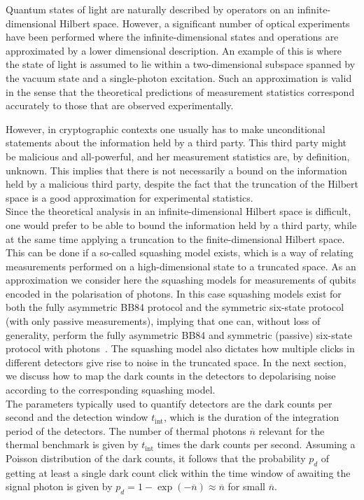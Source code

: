 \documentclass[aps,pra,reprint,superscriptaddress]{revtex4-1}
\begin{document}
Quantum states of light are naturally described by operators on an infinite-dimensional Hilbert space. However, a significant number of optical experiments have been performed where the infinite-dimensional states and operations are approximated by a lower dimensional description. An example of this is where the state of light is assumed to lie within a two-dimensional subspace spanned by the vacuum state and a single-photon excitation. Such an approximation is valid in the sense that the theoretical predictions of measurement statistics correspond accurately to those that are observed experimentally.

However, in cryptographic contexts one usually has to make unconditional statements about the information held by a third party. This third party might be malicious and all-powerful, and her measurement statistics are, by definition, unknown. This implies that there is not necessarily a bound on the information held by a malicious third party, despite the fact that the truncation of the Hilbert space is a good approximation for experimental statistics.\\

Since the theoretical analysis in an infinite-dimensional Hilbert space is difficult, one would prefer to be able to bound the information held by a third party, while at the same time applying a truncation to the finite-dimensional Hilbert space. This can be done if a so-called squashing model exists, which is a way of relating measurements performed on a high-dimensional state to a truncated space. As an approximation we consider here the squashing models for measurements of qubits encoded in the polarisation of photons. In this case squashing models exist for both the fully asymmetric BB84 protocol and the symmetric six-state protocol (with only passive measurements), implying that one can, without loss of generality, perform the fully asymmetric BB84 and symmetric (passive) six-state protocol with photons~\cite{gittsovich2014squashing,beaudry2008squashing}. The squashing model also dictates how multiple clicks in different detectors give rise to noise in the truncated space. In the next section, we discuss how to map the dark counts in the detectors to depolarising noise according to the corresponding squashing model.\\



The parameters typically used to quantify detectors are the dark counts per second and the detection window $t_{\textrm{int}}$, which is the duration of the integration period of the detectors. The number of thermal photons $\overline{n}$ relevant for the thermal benchmark is given by $t_{\textrm{int}}$ times the dark counts per second. Assuming a Poisson distribution of the dark counts, it follows that the probability $p_d$ of getting at least a single dark count click within the time window of awaiting the signal photon is given by $p_d = 1-\exp(-\overline{n})\approx \overline{n}$ for small $\overline{n}$.
\end{document}
